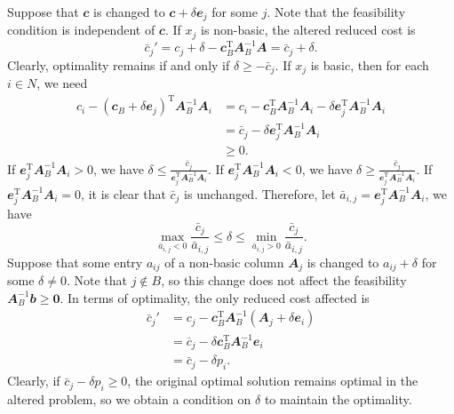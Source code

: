 \documentclass[math, code]{amznotes}
\theoremstyle{remark}
\begin{document}
Suppose that $\mathbfit{c}$ is changed to $\mathbfit{c} + \delta\mathbfit{e}_j$ for some $j$. Note that 
the feasibility condition is independent of $\mathbfit{c}$. If $x_j$ is non-basic, the altered reduced cost is 
\begin{equation*}
    \bar{c}_j' = c_j + \delta - \mathbfit{c}_B^{\mathrm{T}}\mathbfit{A}_B^{-1}\mathbfit{A} = \bar{c}_j + \delta.
\end{equation*}
Clearly, optimality remains if and only if $\delta \geq -\bar{c}_j$. If $x_j$ is basic, then for each $i \in N$, we need 
\begin{align*}
    c_i - \left(\mathbfit{c}_B + \delta\mathbfit{e}_j\right)^{\mathrm{T}}\mathbfit{A}_B^{-1}\mathbfit{A}_i & = c_i - \mathbfit{c}_B^{\mathrm{T}}\mathbfit{A}_B^{-1}\mathbfit{A}_i - \delta\mathbfit{e}_j^{\mathrm{T}}\mathbfit{A}_B^{-1}\mathbfit{A}_i \\
    & = \bar{c}_j - \delta\mathbfit{e}_j^{\mathrm{T}}\mathbfit{A}_B^{-1}\mathbfit{A}_i \\
    & \geq 0.
\end{align*}
If $\mathbfit{e}_j^{\mathrm{T}}\mathbfit{A}_B^{-1}\mathbfit{A}_i > 0$, we have $\delta \leq \frac{\bar{c}_j}{\mathbfit{e}_j^{\mathrm{T}}\mathbfit{A}_B^{-1}\mathbfit{A}_i}$. If $\mathbfit{e}_j^{\mathrm{T}}\mathbfit{A}_B^{-1}\mathbfit{A}_i < 0$, we have $\delta \geq \frac{\bar{c}_j}{\mathbfit{e}_j^{\mathrm{T}}\mathbfit{A}_B^{-1}\mathbfit{A}_i}$. If $\mathbfit{e}_j^{\mathrm{T}}\mathbfit{A}_B^{-1}\mathbfit{A}_i = 0$, it is clear that $\bar{c}_j$ is unchanged. Therefore, let $\bar{a}_{i, j} = \mathbfit{e}_j^{\mathrm{T}}\mathbfit{A}_B^{-1}\mathbfit{A}_i$, we have
\begin{equation*}
    \max_{\bar{a}_{i, j} < 0} \frac{\bar{c}_j}{\bar{a}_{i, j}} \leq \delta \leq \min_{\bar{a}_{i, j} > 0} \frac{\bar{c}_j}{\bar{a}_{i, j}}.
\end{equation*}
Suppose that some entry $a_{ij}$ of a non-basic column $\mathbfit{A}_j$ is changed to $a_{ij} + \delta$ for some $\delta \neq 0$. Note that $j \notin B$, so this change does not affect the feasibility $\mathbfit{A}_B^{-1}\mathbfit{b} \geq \mathbf{0}$. In terms of optimality, the only reduced cost affected is 
\begin{align*}
    \bar{c}_j' & = c_j - \mathbfit{c}_B^{\mathrm{T}}\mathbfit{A}_B^{-1}\left(\mathbfit{A}_j + \delta\mathbfit{e}_i\right) \\
    & = \bar{c}_j - \delta\mathbfit{c}_B^{\mathrm{T}}\mathbfit{A}_B^{-1}\mathbfit{e}_i \\
    & = \bar{c}_j - \delta p_i.
\end{align*}
Clearly, if $\bar{c}_j - \delta p_i \geq 0$, the original optimal solution remains optimal in the altered problem, so we obtain a condition on $\delta$ to maintain the optimality.
\end{document}
